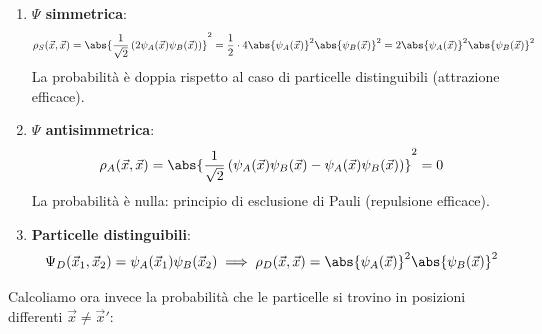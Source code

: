 \begin{enumerate}
    \item \textbf{\(\Psi\) simmetrica}:
    \begin{equation}
        \rho_S(\vec{x}, \vec{x}) = \abs{\frac{1}{\sqrt{2}} \left( 2\psi_A(\vec{x})\psi_B(\vec{x}) \right)}^2 = \frac{1}{2} \cdot 4 \abs{\psi_A(\vec{x})}^2 \abs{\psi_B(\vec{x})}^2 = 2 \abs{\psi_A(\vec{x})}^2 \abs{\psi_B(\vec{x})}^2
    \end{equation}
    La probabilità è doppia rispetto al caso di particelle distinguibili (attrazione efficace).

    \item \textbf{\(\Psi\) antisimmetrica}:
    \begin{equation}
        \rho_A(\vec{x}, \vec{x}) = \abs{\frac{1}{\sqrt{2}} \left( \psi_A(\vec{x})\psi_B(\vec{x}) - \psi_A(\vec{x})\psi_B(\vec{x}) \right)}^2 = 0
    \end{equation}
    La probabilità è nulla: principio di esclusione di Pauli (repulsione efficace).

    \item \textbf{Particelle distinguibili}:
    \begin{equation}
        \Psi_D(\vec{x}_1, \vec{x}_2) = \psi_A(\vec{x}_1)\psi_B(\vec{x}_2)\implies 
            \rho_D(\vec{x}, \vec{x}) = \abs{\psi_A(\vec{x})}^2 \abs{\psi_B(\vec{x})}^2
    \end{equation}
\end{enumerate}

Calcoliamo ora invece la probabilità che le particelle si trovino in posizioni differenti \(\vec{x}\neq \vec{x}'\):

